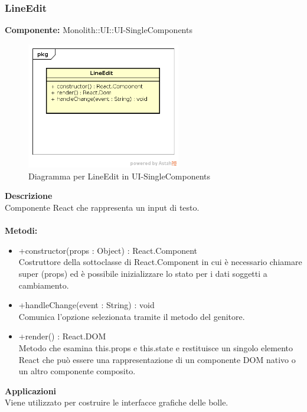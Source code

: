 \subsubsection{LineEdit}
\textbf{Componente:}  Monolith::UI::UI-SingleComponents\\
   \FloatBarrier
   \begin{figure}[ht]
   \centering
   \includegraphics[width=0.6\textwidth]{img/single-LineEdit}
   \caption{{Diagramma per LineEdit in UI-SingleComponents}}
\end{figure}
\FloatBarrier
\textbf{Descrizione}\\
Componente React che rappresenta un input di testo. \\\\
\textbf{Metodi:} \begin{itemize}\item +constructor(props : Object) : React.Component \\Costruttore della sottoclasse di React.Component in cui è necessario chiamare super (props) ed è possibile inizializzare lo stato per i dati soggetti a cambiamento.\item +handleChange(event : String) : void  \\Comunica l’opzione selezionata tramite il metodo del genitore. \item +render() : React.DOM \\Metodo che esamina this.props e this.state e restituisce un singolo elemento React che può essere una rappresentazione di un componente DOM nativo o un altro componente composito.\end{itemize} 


\textbf{Applicazioni}\\
Viene utilizzato per costruire le interfacce grafiche delle bolle. 


\clearpage


